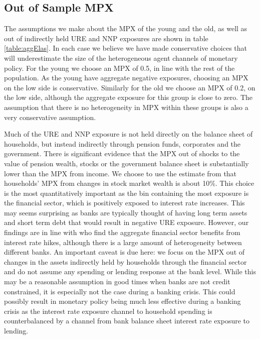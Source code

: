 \documentclass[titlepage]{\econtex}\newcommand{\texname}{ConsumptionHeterogeneity}
\begin{document}
\subsection{Out of Sample MPX}
The assumptions we make about the MPX of the young and the old, as well as out of indirectly held URE and NNP exposures are shown in table \ref{table:aggElas}. In each case we believe we have made conservative choices that will underestimate the size of the heterogeneous agent channels of monetary policy. For the young we choose an MPX of 0.5, in line with the rest of the population. As the young have aggregate negative exposures, choosing an MPX on the low side is conservative. Similarly for the old we choose an MPX of 0.2, on the low side, although the aggregate exposure for this group is close to zero. The assumption that there is no heterogeneity in MPX within these groups is also a very conservative assumption.

Much of the URE and NNP exposure is not held directly on the balance sheet of households, but instead indirectly through pension funds, corporates and the government. There is significant evidence that the MPX out of shocks to the value of pension wealth, stocks or the government balance sheet is substantially lower than the MPX from income. We choose to use the estimate from \cite{maggio_stock_2018} that households' MPX from changes in stock market wealth is about 10\%. This choice is the most quantitatively important as the bin containing the most exposure is the financial sector, which is positively exposed to interest rate increases. This may seems surprising as banks are typically thought of having long term assets and short term debt that would result in negative URE exposure. However, our findings are in line with \cite{landier_banks_2013} who find the aggregate financial sector benefits from interest rate hikes, although there is a large amount of heterogeneity between different banks. An important caveat is due here: we focus on the MPX out of changes in the assets indirectly held by households through the financial sector and do not assume any spending or lending response at the bank level. While this may be a reasonable assumption in good times when banks are not credit constrained, it is especially not the case during a banking crisis. This could possibly result in monetary policy being much less effective during a banking crisis as the interest rate exposure channel to household spending is counterbalanced by a channel from bank balance sheet interest rate exposure to lending. 
\end{document}
